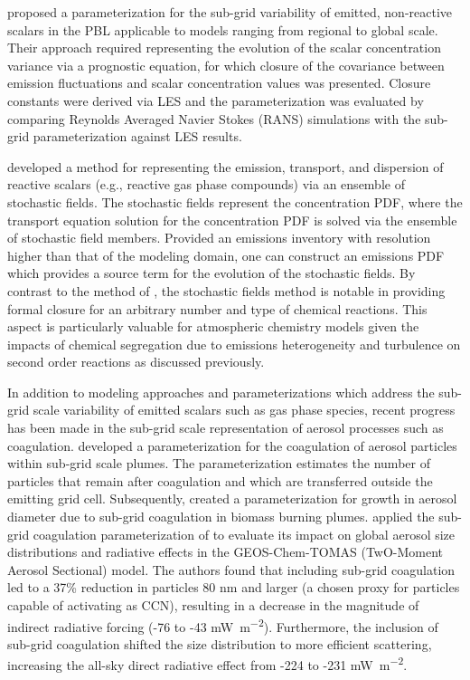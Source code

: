  \cite{galmarini_modeling_2008} proposed a parameterization for the sub-grid variability of emitted, non-reactive scalars in the PBL applicable to models ranging from regional to global scale. Their approach required representing the evolution of the scalar concentration variance via a prognostic equation, for which closure of the covariance between emission fluctuations and scalar concentration values was presented. Closure constants were derived via LES and the parameterization was evaluated by comparing Reynolds Averaged Navier Stokes (RANS) simulations with the sub-grid parameterization against LES results. 
 
\cite{cassiani_stochastic_2010} developed a method for representing the emission, transport, and dispersion of reactive scalars (e.g., reactive gas phase compounds) via an ensemble of stochastic fields. The stochastic fields represent the concentration PDF, where the transport equation solution for the concentration PDF is solved via the ensemble of stochastic field members. Provided an emissions inventory with resolution higher than that of the modeling domain, one can construct an emissions PDF which provides a source term for the evolution of the stochastic fields. By contrast to the method of \cite{galmarini_modeling_2008}, the stochastic fields method is notable in providing formal closure for an arbitrary number and type of chemical reactions. This aspect is particularly valuable for atmospheric chemistry models given the impacts of chemical segregation due to emissions heterogeneity and turbulence on second order reactions as discussed previously.   

In addition to modeling approaches and parameterizations which address the sub-grid scale variability of emitted scalars such as gas phase species, recent progress has been made in the sub-grid scale representation of aerosol processes such as coagulation. \cite{pierce_parameterization_2009} developed a parameterization for the coagulation of aerosol particles within sub-grid scale plumes. The parameterization estimates the number of particles that remain after coagulation and which are transferred outside the emitting grid cell. Subsequently, \cite{sakamoto_evolution_2016} created a parameterization for growth in aerosol diameter due to sub-grid coagulation in biomass burning plumes. \cite{ramnarine_effects_2019} applied the sub-grid coagulation parameterization of \cite{sakamoto_evolution_2016} to evaluate its impact on global aerosol size distributions and radiative effects in the GEOS-Chem-TOMAS (TwO-Moment Aerosol Sectional) model. The authors found that including sub-grid coagulation led to a 37\% reduction in particles 80 nm and larger (a chosen proxy for particles capable of activating as CCN), resulting in a decrease in the magnitude of indirect radiative forcing (-76 to -43 \si{mW.m^{-2}}). Furthermore, the inclusion of sub-grid coagulation shifted the size distribution to more efficient scattering, increasing the all-sky direct radiative effect from -224 to -231 \si{mW.m^{-2}}.


